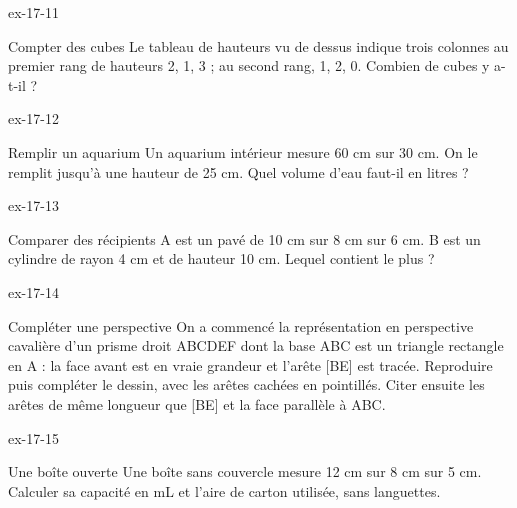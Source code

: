 \begin{blocLivre}{ex-17-11}\begin{exercice}[3]{Compter des cubes}
Le tableau de hauteurs vu de dessus indique trois colonnes au premier rang de hauteurs 2, 1, 3 ; au second rang, 1, 2, 0. Combien de cubes y a-t-il ?
\label{fig-ex-17-11}
\end{exercice}\end{blocLivre}
\begin{blocLivre}{ex-17-12}\begin{exercice}[3]{Remplir un aquarium}
Un aquarium intérieur mesure 60 cm sur 30 cm. On le remplit jusqu’à une hauteur de 25 cm. Quel volume d’eau faut-il en litres ?
\label{fig-ex-17-12}
\end{exercice}\end{blocLivre}
\begin{blocLivre}{ex-17-13}\begin{exercice}[3]{Comparer des récipients}
A est un pavé de 10 cm sur 8 cm sur 6 cm. B est un cylindre de rayon 4 cm et de hauteur 10 cm. Lequel contient le plus ?
\label{fig-ex-17-13}
\end{exercice}\end{blocLivre}
\begin{blocLivre}{ex-17-14}\begin{exercice}[3]{Compléter une perspective}
On a commencé la représentation en perspective cavalière d’un prisme droit ABCDEF dont la base ABC est un triangle rectangle en A : la face avant est en vraie grandeur et l’arête [BE] est tracée. Reproduire puis compléter le dessin, avec les arêtes cachées en pointillés. Citer ensuite les arêtes de même longueur que [BE] et la face parallèle à ABC.
\label{fig-ex-17-14}
\end{exercice}\end{blocLivre}
\begin{blocLivre}{ex-17-15}\begin{exercice}[3]{Une boîte ouverte}
Une boîte sans couvercle mesure 12 cm sur 8 cm sur 5 cm. Calculer sa capacité en mL et l’aire de carton utilisée, sans languettes.
\label{fig-ex-17-15}
\end{exercice}\end{blocLivre}

\clearpage
